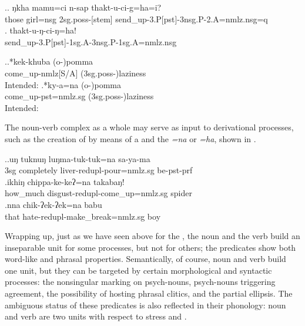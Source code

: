  	\ex.\ag. ŋkha mamu=ci n-sap thakt-u-ci-g=ha=i?\\
	those girl{\sc =nsg} {\sc 2sg.poss-[stem]} send\_up-{\sc 3.P[pst]-3nsg.P-2.A=nmlz.nsg=q}\\
	\bg. thakt-u-ŋ-ci-ŋ=ha!\\
	send\_up-{\sc 3.P[pst]-1sg.A-3nsg.P-1sg.A=nmlz.nsg}\\

	\ex.\ag.*kek-khuba (o-)pomma\\
	come\_up-{\sc nmlz[S/A]} ({\sc 3sg.poss-})laziness\\
	Intended: 
	\bg.*ky-a=na (o-)pomma\\
	come\_up{\sc -pst=nmlz.sg} ({\sc 3sg.poss-})laziness\\
	Intended: 

	
The noun-verb complex as a whole may serve as input to derivational processes, such as the creation of  by means of a  and the  \emph{=na} or \emph{=ha}, shown in \Next. 

\ex.\ag.uŋ tuknuŋ    luŋma-tuk-tuk=na       sa-ya-ma\\
{\sc 3sg} completely liver-{\sc redupl-}pour{\sc =nmlz.sg}  be{\sc [3]-pst-prf}\\
\bg.ikhiŋ chippa-ke-keʔ=na  takabaŋ!\\
how\_much disgust-{\sc redupl-}come\_up{\sc =nmlz.sg} spider\\
\bg.nna chik-ʔek-ʔek=na  babu\\
that hate-{\sc redupl-}make\_break{\sc =nmlz.sg} boy\\


Wrapping up, just as we have seen above for the , the noun and the verb build an inseparable unit for some processes, but not for others; the predicates show both word-like and phrasal properties. Semantically, of course, noun and verb build one unit, but  they can be targeted by certain morphological and syntactic processes: the nonsingular marking on psych-nouns, psych-nouns triggering agreement, the possibility of hosting phrasal clitics, and the partial ellipsis. The ambiguous status of these predicates is also reflected in their phonology: noun and verb are two units with respect to stress and .  

